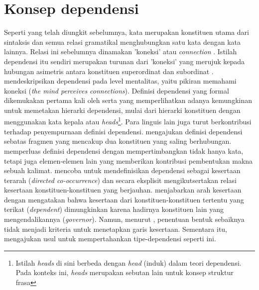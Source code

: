 \section{Konsep dependensi}
Seperti yang telah diungkit sebelumnya, kata merupakan konstituen utama dari sintaksis dan semua relasi gramatikal menghubungkan satu kata dengan kata lainnya. Relasi ini sebelumnya dinamakan 'koneksi' atau \textit{connection} \citep{tesniere1959elements}. Istilah dependensi itu sendiri merupakan turunan dari 'koneksi' yang merujuk kepada hubungan asimetris antara konstituen superordinat dan subordinat \citep{hudson1984word}. \cite{tesniere1959elements} mendeskripsikan dependensi pada level mentalitas, yaitu pikiran memahami koneksi (\textit{the mind perceives connections}). Definisi dependensi yang formal dikemukakan pertama kali oleh \cite{lecerf1960programme} serta \cite{gladkij1966lekcii} yang memperlihatkan adanya kemungkinan untuk memetakan hierarki dependensi, mulai dari hierarki konstituen dengan menggunakan kata kepala atau \textit{heads}\footnote{Istilah \textit{heads} di sini berbeda dengan \textit{head} (induk) dalam teori dependensi. Pada konteks ini, \textit{heads} merupakan sebutan lain untuk konsep struktur frasa}. Para linguis lain juga turut berkontribusi terhadap penyempurnaan definisi dependensi. \cite{mel'vcuk1988dependency} mengajukan definisi dependensi sebatas fragmen yang mencakup dua konstituen yang saling berhubungan. \cite{garde1977ordre} memperluas definisi dependensi dengan mempertimbangkan tidak hanya kata, tetapi juga elemen-elemen lain yang memberikan kontribusi pembentukan makna sebuah kalimat. \cite{schubert1987metataxis} mencoba untuk mendefinisikan dependensi sebagai kesertaan terarah (\textit{directed co-occurrence}) dan secara eksplisit mengikutsertakan relasi kesertaan konstituen-konstituen yang berjauhan. \cite{schubert1987metataxis} menjabarkan arah kesertaan dengan mengatakan bahwa kesertaan dari konstituen-konstituen tertentu yang terikat (\textit{dependent}) dimungkinkan karena hadirnya konstituen lain yang mengendalikannya (\textit{governor}). Namun, menurut \cite{schubert1987metataxis}, penentuan bentuk sebaiknya tidak menjadi kriteria untuk menetapkan garis kesertaan. Sementara itu, \cite{hudson1994discontinuous} mengajukan usul untuk mempertahankan \gls{tipe-dependensi} seperti ini.

